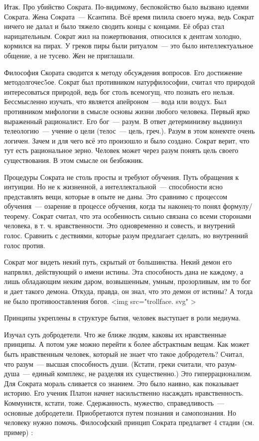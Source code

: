 Итак. Про убийство Сократа. По-видимому, беспокойство было вызвано идеями Сократа. 
Жена Сократа~--- Ксантипа. Всё время пилила своего мужа, ведь Сократ ничего не далал и было тяжело сводить концы с концами. Её образ стал нарицательным. 
Сократ жил на пожертвования, относился к дентгам холодно, кормился на пирах. У греков пиры были ритуалом~--- это было интеллектуальное общение, а не тусево. Жен не приглашали. 

Философия Скората сводится к методу обсуждения вопросов. Его достижение методолгочес5ое. 
Сократ был противником натурфилософии, считал что природой интересоваться природой, ведь бог столь всемогущ, что познать его нельзя. Бессмысленно изучать, что является апейроном~--- вода или воздух. 
Был противником мифологии в смысле основы жизни любого человека. Первый ярко выраженный рационалист. Его бог~--- разум. В ответ детерминизму выдвинул телеологию~--- учение о цели (телос~--- цель, греч.). 
Разум в этом конекчте очень логичен. Зачем и для чего всё это произошло и было создано. Сократ верит, что тут есть рациональное зерно. Человек может через разум понять цель своего существования. В этом смысле он безбожник. 

Процедуры Сократа не столь просты и требуют обучения. Путь обращения к интуиции. Но не к жизненной, а интеллектальной~--- способности ясно представлять вещи, которые в опыте не даны. 
Это сравнимо с процессом обучения~--- озарение в процессе обучения, когда ты наконец-то понял формулу/теорему. Сократ считал, что эта особенность сильно связана со всеми сторонами человека, в т. ч. нравственности. 
Это одновременно и совесть, и внутрений голос. Сравнить с дествиями, которые разум предлагает сделать, но внутренний голос против. 

Сократ мог видеть некий путь, скрытый от большинства. Некий демон его напрвлял, действующий о имени истины. Эта способность дана не каждому, а лишь обладающим неким даром, возвышенным, умным, прозорливым, им то бог и дает такого демона. 
Откуда, правда, он знал, что это демон от истины? А тогда не было противооставления богов. <img src="trollface. svg" >

Принципы укреплены в структуре бытия, человек выступает в роли медиума. 

Изучал суть добродетели. Что же ближе людям, каковы их нравственные принципы. А потом уже можно перейти к более абстрактным вещам. 
Как может быть нравственным человек, который не знает что такое добродетель? Считал, что разум~--- высшая способность души. (Кстати, греки считали, что разум-душа~--- единый комплекс, не разделяя их существенно.) Это гиперрационализм. 
Для Сократа мораль сливается со знанием. Это было наивно, как показывает историю. Его ученик Платон начнет насильственно насаждать нравственность. Коммунистя, кстати, тоже. 
Сдержанность, мужество, справедливость~--- основные добродетели. Приобретаются путем познания и самопознания. Но человеку нужно помочь. 
Философский принцип Сократа предлагвет 4 стадии (см. пример) :


